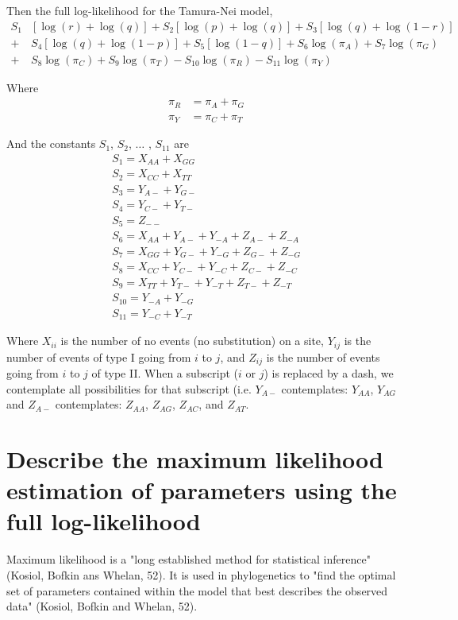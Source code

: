 \documentclass[12pt,twoside]{article}
\begin{document}
Then the full log-likelihood for the Tamura-Nei model,
\begin{align}
S_{1}&[ \log{(r)}+\log{(q)}] + S_{2}[ \log{(p)}+\log{(q)}] + S_{3}[ \log{(q)}+\log{(1-r)}] \\
 + &S_{4}[ \log{(q)}+\log{(1-p)}] + S_{5}[ \log{(1-q)}]+ S_{6} \log{(\pi_{A})} + S_{7} \log{(\pi_{G})} \\
 + &S_{8} \log{(\pi_{C})} + S_{9} \log{(\pi_{T})} - S_{10} \log{(\pi_{R})} - S_{11} \log{(\pi_{Y})}
\end{align}

Where
\begin{align}
\pi_{R} &= \pi_{A} + \pi_{G} \\
\pi_{Y} &= \pi_{C} + \pi_{T}
\end{align}

And the constants $S_{1}$, $S_{2}$, $\dots$ , $S_{11}$ are
\begin{align}
S_{1} = X_{AA} + X_{GG} \\
S_{2} = X_{CC} + X_{TT} \\
S_{3} = Y_{A-} + Y_{G-} \\
S_{4} = Y_{C-} + Y_{T-} \\
S_{5} = Z_{--} \\
S_{6} = X_{AA} + Y_{A-} + Y_{-A} + Z_{A-} + Z_{-A} \\
S_{7} = X_{GG} + Y_{G-} + Y_{-G} + Z_{G-} + Z_{-G} \\
S_{8} = X_{CC} + Y_{C-} + Y_{-C} + Z_{C-} + Z_{-C} \\
S_{9} = X_{TT} + Y_{T-} + Y_{-T} + Z_{T-} + Z_{-T} \\
S_{10} = Y_{-A} + Y_{-G} \\
S_{11} = Y_{-C} + Y_{-T}
\end{align}

Where $X_{ii}$ is the number of no events (no substitution) on a site, $Y_{ij}$ is the number of events of type I going from $i$ to $j$, and $Z_{ij}$ is the number of events going from $i$ to $j$ of type II. When a subscript ($i$ or $j$) is replaced by a dash, we contemplate all possibilities for that subscript (i.e. $Y_{A-}$ contemplates: $Y_{AA}$, $Y_{AG}$ and $Z_{A-}$ contemplates: $Z_{AA}$, $Z_{AG}$, $Z_{AC}$, and $Z_{AT}$.


\section{Describe the maximum likelihood estimation of parameters using the full log-likelihood}
Maximum likelihood is a "long established method for statistical inference" (Kosiol, Bofkin ans Whelan, 52). It is used in phylogenetics to "find the optimal set of parameters contained within the model that best describes the observed data" (Kosiol, Bofkin and Whelan, 52).
\end{document}
